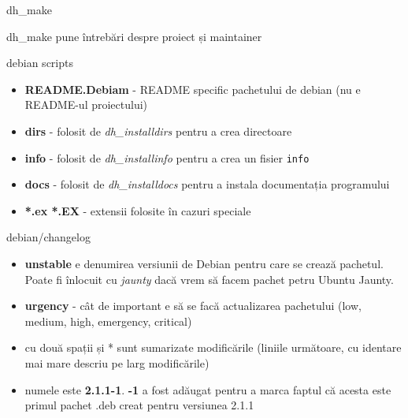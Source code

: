 \documentclass{beamer}
\begin{document}
\begin{frame}{dh\_make}
    \begin{beamerboxesrounded}[lower=block body,shadow=true]{dh\_make pune întrebări despre proiect și maintainer}
      \small 
    \end{beamerboxesrounded}
\end{frame}

\begin{frame}{debian\/ scripts}
  \begin{itemize}
    \begin{beamerboxesrounded}[lower=block body,shadow=true]{2\_rm\_unneeded.sh - delete unneeded files from debian\/}
      \small 
    \end{beamerboxesrounded}
  \item \textbf{README.Debiam} - README specific pachetului de debian (nu e README-ul proiectului)
  \item \textbf{dirs} - folosit de \textit{dh\_installdirs} pentru a crea directoare
  \item \textbf{info} - folosit de \textit{dh\_installinfo} pentru a crea un fisier \texttt{info}
  \item \textbf{docs} - folosit de \textit{dh\_installdocs} pentru a instala documentația programului
  \item \textbf{*.ex *.EX} - extensii folosite în cazuri speciale
  \end{itemize}
\end{frame}


\begin{frame}{debian/changelog}
  \begin{beamerboxesrounded}[lower=block body,shadow=true]{}
    \scriptsize 
  \end{beamerboxesrounded}
  \begin{itemize}
  \item \textbf{unstable} e denumirea versiunii de Debian pentru care se crează pachetul. 
    Poate fi înlocuit cu \textit{jaunty} dacă vrem să facem pachet petru Ubuntu Jaunty.
  \item \textbf{urgency} - cât de important e să se facă actualizarea pachetului 
    (low, medium, high, emergency, critical)
  \item cu două spații și * sunt sumarizate modificările (liniile următoare, cu identare mai
    mare descriu pe larg modificările)
  \item numele este \textbf{2.1.1-1}. \textbf{-1} a fost adăugat pentru a marca faptul că 
    acesta este primul pachet .deb creat pentru versiunea 2.1.1
  \end{itemize}
  
\end{frame}
\end{document}
